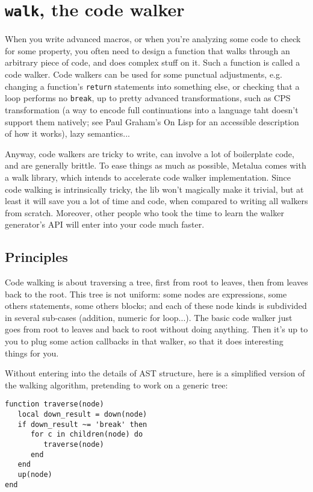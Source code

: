 \section{{\tt walk}, the code walker}

When you write advanced macros, or when you're analyzing some code to check for
some property, you often need to design a function that walks through an
arbitrary piece of code, and does complex stuff on it. Such a function is called
a code walker. Code walkers can be used for some punctual adjustments, e.g.
changing a function's {\tt return} statements into something else, or checking
that a loop performs no {\tt break}, up to pretty advanced transformations, such
as CPS transformation (a way to encode full continuations into a language taht
doesn't support them natively; see Paul Graham's On Lisp for an accessible
description of how it works), lazy semantics...

Anyway, code walkers are tricky to write, can involve a lot of boilerplate code,
and are generally brittle. To ease things as much as possible, Metalua comes
with a walk library, which intends to accelerate code walker implementation.
Since code walking is intrinsically tricky, the lib won't magically make it
trivial, but at least it will save you a lot of time and code, when compared to
writing all walkers from scratch. Moreover, other people who took the time to
learn the walker generator's API will enter into your code much faster.

\subsection{Principles}

Code walking is about traversing a tree, first from root to leaves, then from
leaves back to the root. This tree is not uniform: some nodes are expressions,
some others statements, some others blocks; and each of these node kinds is
subdivided in several sub-cases (addition, numeric for loop...). The basic code
walker just goes from root to leaves and back to root without doing anything.
Then it's up to you to plug some action callbacks in that walker, so that it
does interesting things for you.

Without entering into the details of AST structure, here is a simplified version
of the walking algorithm, pretending to work on a generic tree:

\begin{verbatim}
function traverse(node)
   local down_result = down(node)
   if down_result ~= 'break' then 
      for c in children(node) do
         traverse(node)
      end
   end
   up(node)
end
\end{verbatim}


